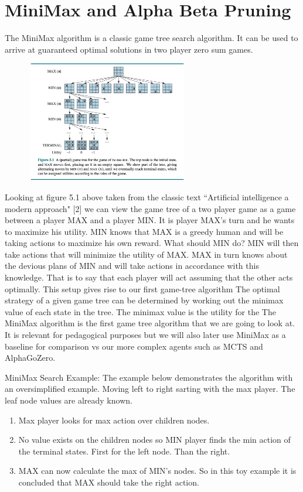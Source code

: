 \section{MiniMax and Alpha Beta Pruning}

The MiniMax algorithm is a classic game tree search algorithm. It can be used to arrive at guaranteed optimal solutions in two player zero sum games. 

\includegraphics[width=350px,height=200px]{images/aim_figure_5_1.png}

Looking at figure 5.1 above taken from the classic text ``Artificial intelligence a modern approach" [2] we can view the game tree of a two player game as a game between a player MAX and a player MIN. It is player MAX's turn and he wants to maximize his utility. MIN knows that MAX is a greedy human and will be taking actions to maximize his own reward. What should MIN do? MIN will then take actions that will minimize the utility of MAX. MAX in turn knows about the devious plans of MIN and will take actions in accordance with this knowledge. That is to say that each player will act assuming that the other acts optimally. This setup gives rise to our first game-tree algorithm  
The optimal strategy of a given game tree can be determined by working out the minimax value of each state in the tree. The minimax value is the utility for the 
The MiniMax algorithm is the first game tree algorithm that we are going to look at. It is relevant for pedagogical purposes but we will also later use MiniMax as a baseline for comparison vs our more complex agents such as MCTS and AlphaGoZero. 

MiniMax Search Example: The example below demonstrates the algorithm with an oversimplified example. Moving left to right sarting with the max player. The leaf node values are already known. 

\begin{enumerate}
    \item Max player looks for max action over children nodes.  
    \item No value exists on the children nodes so MIN player finds the min action of the terminal states. First for the left node. Than the right. 
    \item MAX can now calculate the max of MIN's nodes. So in this toy example it is concluded that MAX should take the right action. 
\end{enumerate}

